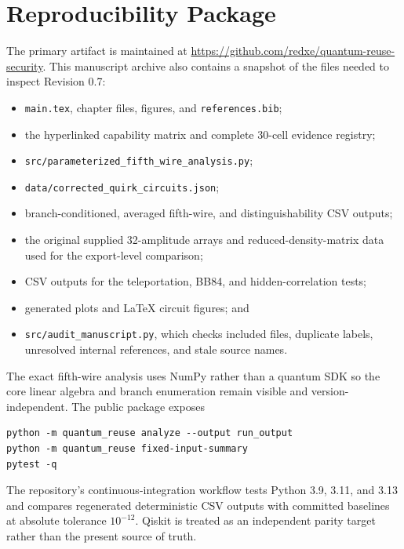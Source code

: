 \section{Reproducibility Package}
\label{app:reproducibility}

The primary artifact is maintained at
\url{https://github.com/redxe/quantum-reuse-security}. This manuscript archive
also contains a snapshot of the files needed to inspect Revision 0.7:

\begin{itemize}
  \item \texttt{main.tex}, chapter files, figures, and
  \texttt{references.bib};
  \item the hyperlinked capability matrix and complete 30-cell evidence
  registry;
  \item \texttt{src/parameterized\_fifth\_wire\_analysis.py};
  \item \texttt{data/corrected\_quirk\_circuits.json};
  \item branch-conditioned, averaged fifth-wire, and distinguishability CSV
  outputs;
  \item the original supplied 32-amplitude arrays and reduced-density-matrix
  data used for the export-level comparison;
  \item CSV outputs for the teleportation, BB84, and hidden-correlation tests;
  \item generated plots and LaTeX circuit figures; and
  \item \texttt{src/audit\_manuscript.py}, which checks included files,
  duplicate labels, unresolved internal references, and stale source names.
\end{itemize}

The exact fifth-wire analysis uses NumPy rather than a quantum SDK so the core
linear algebra and branch enumeration remain visible and version-independent.
The public package exposes
\begin{lstlisting}[style=python]
python -m quantum_reuse analyze --output run_output
python -m quantum_reuse fixed-input-summary
pytest -q
\end{lstlisting}
The repository's continuous-integration workflow tests Python 3.9, 3.11, and
3.13 and compares regenerated deterministic CSV outputs with committed
baselines at absolute tolerance $10^{-12}$. Qiskit is treated as an independent
parity target rather than the present source of truth.

